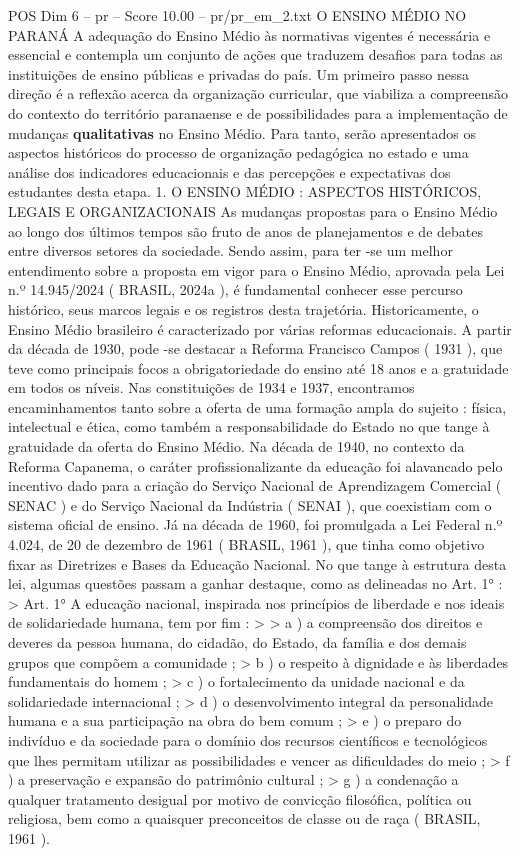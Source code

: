 \begin{textsample}{POS Dim 6 – pr – Score 10.00 – pr/pr\_em\_2.txt}  \label{ex:f6_pos_023}
O ENSINO MÉDIO NO PARANÁ A adequação do Ensino Médio às normativas vigentes é necessária e essencial e contempla um conjunto de ações que traduzem desafios para todas as instituições de ensino públicas e privadas do país.
Um primeiro passo nessa direção é a reflexão acerca da organização curricular, que viabiliza a compreensão do contexto do território paranaense e de possibilidades para a implementação de mudanças \textbf{qualitativas} no Ensino Médio.
Para tanto, serão apresentados os aspectos históricos do processo de organização pedagógica no estado e uma análise dos indicadores educacionais e das percepções e expectativas dos estudantes desta etapa. 1.
O ENSINO MÉDIO : ASPECTOS HISTÓRICOS, LEGAIS E ORGANIZACIONAIS As mudanças propostas para o Ensino Médio ao longo dos últimos tempos são fruto de anos de planejamentos e de debates entre diversos setores da sociedade.
Sendo assim, para ter -se um melhor entendimento sobre a proposta em vigor para o Ensino Médio, aprovada pela Lei n.º 14.945/2024 ( BRASIL, 2024a ), é fundamental conhecer esse percurso histórico, seus marcos legais e os registros desta trajetória.
Historicamente, o Ensino Médio brasileiro é caracterizado por várias reformas educacionais.
A partir da década de 1930, pode -se destacar a Reforma Francisco Campos ( 1931 ), que teve como principais focos a obrigatoriedade do ensino até 18 anos e a gratuidade em todos os níveis.
Nas constituições de 1934 e 1937, encontramos encaminhamentos tanto sobre a oferta de uma formação ampla do sujeito : física, intelectual e ética, como também a responsabilidade do Estado no que tange à gratuidade da oferta do Ensino Médio.
Na década de 1940, no contexto da Reforma Capanema, o caráter profissionalizante da educação foi alavancado pelo incentivo dado para a criação do Serviço Nacional de Aprendizagem Comercial ( SENAC ) e do Serviço Nacional da Indústria ( SENAI ), que coexistiam com o sistema oficial de ensino.
Já na década de 1960, foi promulgada a Lei Federal n.º 4.024, de 20 de dezembro de 1961 ( BRASIL, 1961 ), que tinha como objetivo fixar as Diretrizes e Bases da Educação Nacional.
No que tange à estrutura desta lei, algumas questões passam a ganhar destaque, como as delineadas no Art. 1{\EmojiFont °} : > Art. 1{\EmojiFont °} A educação nacional, inspirada nos princípios de liberdade e nos ideais de solidariedade humana, tem por fim : > > a ) a compreensão dos direitos e deveres da pessoa humana, do cidadão, do Estado, da família e dos demais grupos que compõem a comunidade ; > b ) o respeito à dignidade e às liberdades fundamentais do homem ; > c ) o fortalecimento da unidade nacional e da solidariedade internacional ; > d ) o desenvolvimento integral da personalidade humana e a sua participação na obra do bem comum ; > e ) o preparo do indivíduo e da sociedade para o domínio dos recursos científicos e tecnológicos que lhes permitam utilizar as possibilidades e vencer as dificuldades do meio ; > f ) a preservação e expansão do patrimônio cultural ; > g ) a condenação a qualquer tratamento desigual por motivo de convicção filosófica, política ou religiosa, bem como a quaisquer preconceitos de classe ou de raça ( BRASIL, 1961 ).

\end{textsample}
